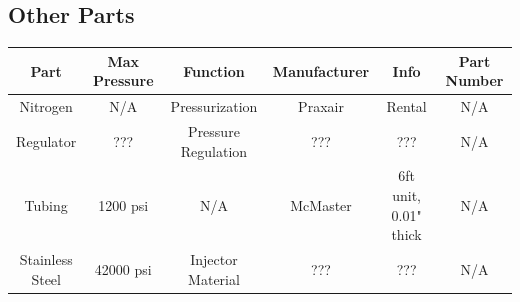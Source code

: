 \documentclass[9pt]{article} %
\numberwithin{equation}{section} %
\begin{document}
\subsection{Other Parts}
\begin{center}
 \begin{tabular}{|c c c c c c|} 
 \hline
 Part & Max Pressure & Function & Manufacturer & Info & Part Number\\
 \hline\hline
 Nitrogen & N/A & Pressurization & Praxair & Rental & N/A\\ 
 \hline
 Regulator & ??? & Pressure Regulation & ??? & ??? & N/A\\
 \hline
 Tubing & 1200 psi & N/A & McMaster & 6ft unit, 0.01" thick & N/A\\
 \hline
 Stainless Steel & 42000 psi & Injector Material & ??? & ??? & N/A\\ [0.5ex]
 \hline
\end{tabular}
\end{center}
\end{document}
